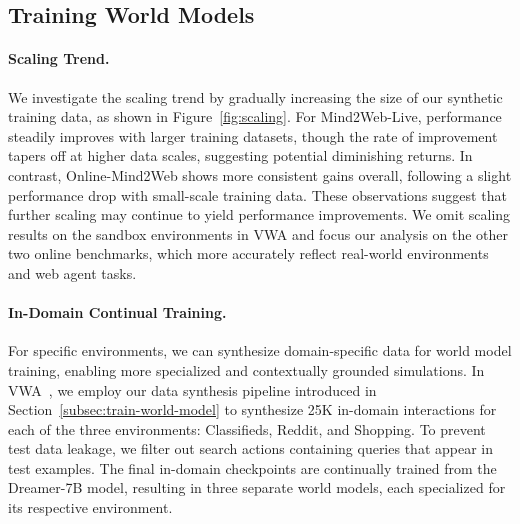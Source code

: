 \subsection{Training World Models}



\paragraph{Scaling Trend.}
We investigate the scaling trend by gradually increasing the size of our synthetic training data, as shown in Figure~\ref{fig:scaling}.
For Mind2Web-Live, performance steadily improves with larger training datasets, though the rate of improvement tapers off at higher data scales, suggesting potential diminishing returns.
In contrast, Online-Mind2Web shows more consistent gains overall, following a slight performance drop with small-scale training data.
These observations suggest that further scaling may continue to yield performance improvements. We omit scaling results on the sandbox environments in VWA and focus our analysis on the other two online benchmarks, which more accurately reflect real-world environments and web agent tasks.

\paragraph{In-Domain Continual Training.}
For specific environments, we can synthesize domain-specific data for world model training, enabling more specialized and contextually grounded simulations.
In VWA~\citep{koh2024visualwebarena}, we employ our data synthesis pipeline introduced in Section~\ref{subsec:train-world-model} to synthesize 25K in-domain interactions for each of the three environments: Classifieds, Reddit, and Shopping.
To prevent test data leakage, we filter out search actions containing queries that appear in test examples.
The final in-domain checkpoints are continually trained from the Dreamer-7B model, resulting in three separate world models, each specialized for its respective environment.



